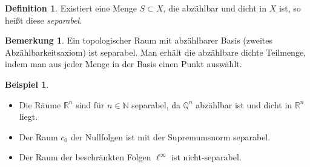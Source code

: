 \documentclass[10pt,a4paper]{article}
\theoremstyle{plain}
\theoremstyle{definition}
\newtheorem{definition}[satz]{Definition}
\newenvironment{dfi}{\begin{shaded}\begin{definition}}{\end{definition}\end{shaded}}
\theoremstyle{nonumberplain}
\newtheorem{beispiel}{Beispiel}
\newenvironment{bsp}{\begin{beispiel}}{\end{beispiel}}
\newtheorem{bemerkung}{Bemerkung}
\newenvironment{bem}{\begin{bemerkung}}{\end{bemerkung}}
\begin{document}
\begin{dfi}
Existiert eine Menge $S \subset X$, die abzählbar und dicht in $X$ ist, so heißt diese \textit{separabel}.
\end{dfi}
\begin{bem}
Ein topologischer Raum mit abzählbarer Basis (zweites Abzählbarkeitsaxiom) ist separabel. Man erhält die abzählbare dichte Teilmenge, indem man aus jeder Menge in der Basis einen Punkt auswählt.
\end{bem}
\begin{bsp}
\quad
\begin{itemize}
\item Die Räume $\mathbb {R} ^{n}$ sind für $n\in \mathbb {N}$ separabel, da ${\mathbb {Q}}^{n}$ abzählbar ist und dicht in $\mathbb {R} ^{n}$ liegt.
\item Der Raum $c_{0}$ der Nullfolgen ist mit der Supremumsnorm separabel.
\item Der Raum der beschränkten Folgen $\ell ^{{\infty }}$ ist nicht-separabel.
\end{itemize}
\end{bsp}
\newpage

\end{document}

